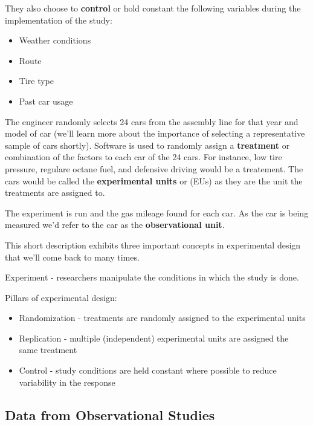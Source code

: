 \documentclass[
]{book}
\providecommand{\tightlist}{%
  \setlength{\itemsep}{0pt}\setlength{\parskip}{0pt}}
\theoremstyle{definition}
\theoremstyle{definition}
\theoremstyle{definition}
\theoremstyle{remark}
\let\BeginKnitrBlock\begin \let\EndKnitrBlock\end
\begin{document}
They also choose to \textbf{control} or hold constant the following variables during the implementation of the study:

\begin{itemize}
\tightlist
\item
  Weather conditions\\
\item
  Route\\
\item
  Tire type\\
\item
  Past car usage
\end{itemize}

The engineer randomly selects 24 cars from the assembly line for that year and model of car (we'll learn more about the importance of selecting a representative sample of cars shortly). Software is used to randomly assign a \textbf{treatment} or combination of the factors to each car of the 24 cars. For instance, low tire pressure, regulare octane fuel, and defensive driving would be a treatement. The cars would be called the \textbf{experimental units} or (EUs) as they are the unit the treatments are assigned to.

The experiment is run and the gas mileage found for each car. As the car is being measured we'd refer to the car as the \textbf{observational unit}.

This short description exhibits three important concepts in experimental design that we'll come back to many times.

\BeginKnitrBlock{definition}
Experiment - researchers manipulate the conditions in which the study is done.
\EndKnitrBlock{definition}

Pillars of experimental design:

\begin{itemize}
\tightlist
\item
  Randomization - treatments are randomly assigned to the experimental units\\
\item
  Replication - multiple (independent) experimental units are assigned the same treatment\\
\item
  Control - study conditions are held constant where possible to reduce variability in the response
\end{itemize}

\hypertarget{data-from-observational-studies}{%
\subsection{Data from Observational Studies}\label{data-from-observational-studies}}
\end{document}
